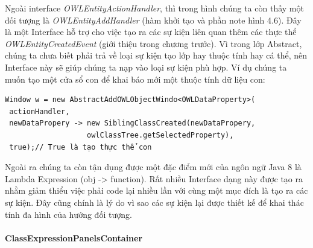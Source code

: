 Ngoài interface \textit{OWLEntityActionHandler}, thì trong hình chúng ta còn thấy một đối tượng là \textit{OWLEntityAddHandler} (hàm khởi tạo và phần note hình 4.6). Đây là một Interface hỗ trợ cho việc tạo ra các sự kiện liên quan thêm các thực thể \textit{OWLEntityCreatedEvent} (giới thiệu trong chương trước). Vì trong lớp Abstract, chúng ta chưa biết phải trả về loại sự kiện tạo lớp hay thuộc tính hay cá thể, nên Interface này sẽ giúp chúng ta nạp vào loại sự kiện phù hợp. Ví dụ chúng ta muốn tạo một cửa sổ con để khai báo mới một thuộc tính dữ liệu con:
\begin{verbatim}
Window w = new AbstractAddOWLObjectWindo<OWLDataProperty>(
 actionHandler,
 newDataPropery -> new SiblingClassCreated(newDataPropery, 
                   owlClassTree.getSelectedProperty),
 true);// True là tạo thực thể con
\end{verbatim}
Ngoài ra chúng ta còn tận dụng được một đặc điểm mới của ngôn ngữ Java 8 là Lambda Expression (obj -> function). Rất nhiều Interface dạng này được tạo ra nhằm giảm thiểu việc phải code lại nhiều lần với cùng một mục đích là tạo ra các sự kiện. Đây cũng chính là lý do vì sao các sự kiện lại được thiết kế để khai thác tính đa hình của hướng đối tượng.
\paragraph{ClassExpressionPanelsContainer}



